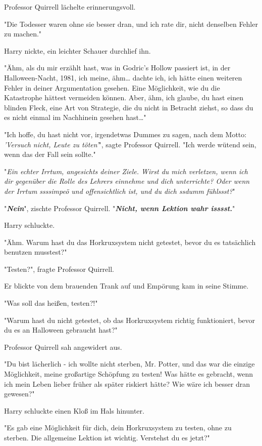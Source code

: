 {Professor Quirrell lächelte erinnerungsvoll.

"Die Todesser waren ohne sie besser dran, und ich rate dir, nicht denselben Fehler zu machen."

Harry nickte, ein leichter Schauer durchlief ihn.

"Ähm, als du mir erzählt hast, was in Godric's Hollow passiert ist, in der Halloween-Nacht, 1981, ich meine, ähm… dachte ich, ich hätte einen weiteren Fehler in deiner Argumentation gesehen. Eine Möglichkeit, wie du die Katastrophe hättest vermeiden können. Aber, ähm, ich glaube, du hast einen blinden Fleck, eine Art von Strategie, die du nicht in Betracht ziehst, so dass du es nicht einmal im Nachhinein gesehen hast…"

"Ich hoffe, du hast nicht vor, irgendetwas Dummes zu sagen, nach dem Motto: \emph{'Versuch nicht, Leute zu töten'}", sagte Professor Quirrell. "Ich werde wütend sein, wenn das der Fall sein sollte."

"\emph{Ein echter Irrtum, angesichts deiner Ziele. Wirst du mich verletzen, wenn ich dir gegenüber die Rolle des Lehrers einnehme und dich unterrichte? Oder wenn der Irrtum ssssimpeö und offensichtlich ist, und du dich ssdumm fühlssst?}"

"\textbf{\emph{Nein}}", zischte Professor Quirrell. "\textbf{\emph{Nicht, wenn Lektion wahr isssst.}}"

Harry schluckte.

"Ähm. Warum hast du das Horkruxsystem nicht getestet, bevor du es tatsächlich benutzen musstest?"

"Testen?", fragte Professor Quirrell.

Er blickte von dem brauenden Trank auf und Empörung kam in seine Stimme.

"Was soll das heißen, testen?!"

"Warum hast du nicht getestet, ob das Horkruxsystem richtig funktioniert, bevor du es an Halloween gebraucht hast?"

Professor Quirrell sah angewidert aus.

"Du bist lächerlich - ich wollte nicht sterben, Mr. Potter, und das war die einzige Möglichkeit, meine großartige Schöpfung zu testen! Was hätte es gebracht, wenn ich mein Leben lieber früher als später riskiert hätte? Wie wäre ich besser dran gewesen?"

Harry schluckte einen Kloß im Hals hinunter.

"Es gab eine Möglichkeit für dich, dein Horkruxsystem zu testen, ohne zu sterben. Die allgemeine Lektion ist wichtig. Verstehst du es jetzt?"

}
